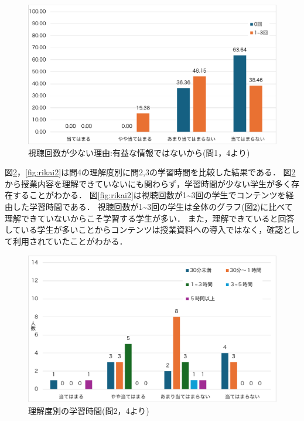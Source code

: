 \documentclass[12pt,a4j,titlepage]{ltjsarticle}
\begin{document}
\begin{figure}[!htb]
\centering
    \centering
    \includegraphics[width=1.0\columnwidth]{有益な情報ではないから.pdf}
    \caption{視聴回数が少ない理由:有益な情報ではないから(問1，4より)}
    \label{fig:yuueki}
\end{figure}

\clearpage

図\ref{fig:rikai1}，\ref{fig:rikai2}は問4の理解度別に問2,3の学習時間を比較した結果である．
図\ref{fig:rikai1}から授業内容を理解できていないにも関わらず，学習時間が少ない学生が多く存在することがわかる．
図\ref{fig:rikai2}は視聴回数が1\textasciitilde3回の学生でコンテンツを経由した学習時間である．
視聴回数が1\textasciitilde3回の学生は全体のグラフ(図\ref{fig:rikai1})に比べて理解できていないからこそ学習する学生が多い．
また，理解できていると回答している学生が多いことからコンテンツは授業資料への導入ではなく，確認として利用されていたことがわかる．


\begin{figure}[!htb]
\centering
    \centering
    \includegraphics[width=1.0\columnwidth]{理解度軸の全体.pdf}
    \caption{理解度別の学習時間(問2，4より)}
    \label{fig:rikai1}
\end{figure}
\end{document}
